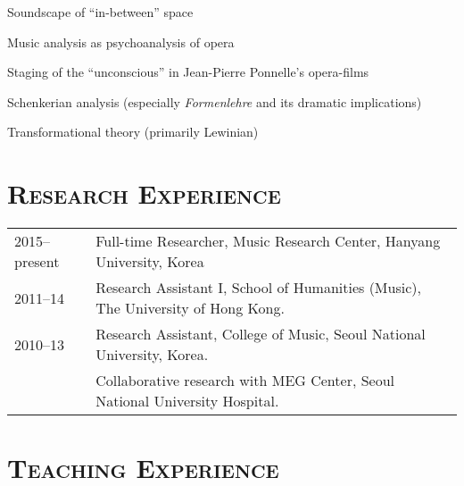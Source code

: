 \documentclass[letter,11pt,draft]{article}
\begin{document}
  \hspace{2mm} \textbullet \hspace{2mm} Soundscape of ``in-between'' space
  
  \noindent \hspace{2mm} \textbullet \hspace{2mm} Music analysis as psychoanalysis of opera
   
  \noindent \hspace{2mm} \textbullet \hspace{2mm} Staging of the ``unconscious'' in Jean-Pierre Ponnelle's opera-films
  
  \noindent \hspace{2mm} \textbullet \hspace{2mm} Schenkerian analysis (especially \textit{Formenlehre} and its dramatic implications)
  
  \noindent \hspace{2mm} \textbullet \hspace{2mm} Transformational theory (primarily Lewinian)
  
  \section*{\textsc{Research Experience}}
  
  \hspace*{-0.25cm}
  \begin{tabular}{p{2.5cm} l}
    2015--present & Full-time Researcher, Music Research Center, Hanyang University, Korea\\[2mm]
    
    2011--14 & Research Assistant I, School of Humanities (Music), The University of Hong Kong.\\[2mm]
    
    2010--13 & Research Assistant, College of Music, Seoul National University, Korea.\\
    & Collaborative research with MEG Center, Seoul National University Hospital.
  \end{tabular}
  
  \vspace*{2.5mm}
  
  \section*{\textsc{Teaching Experience}}
  
\end{document}
